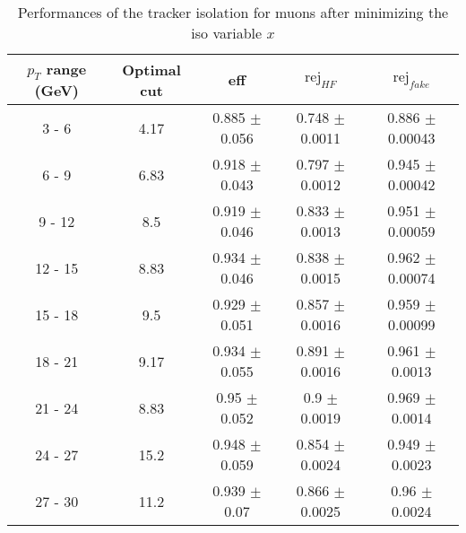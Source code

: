 \begin{table}[htbp]
   \centering
   \begin{tabular}{|c|c|c|c|c|}
      \hline
      $p_T$ range (GeV) & Optimal cut & eff & $\textrm{rej}_{HF}$ & $\textrm{rej}_{fake}$ \\
      \hline
      3 - 6 & 4.17 & 0.885 $\pm$ 0.056 & 0.748 $\pm$ 0.0011 & 0.886 $\pm$ 0.00043 \\
      \hline
      6 - 9 & 6.83 & 0.918 $\pm$ 0.043 & 0.797 $\pm$ 0.0012 & 0.945 $\pm$ 0.00042 \\
      \hline
      9 - 12 & 8.5 & 0.919 $\pm$ 0.046 & 0.833 $\pm$ 0.0013 & 0.951 $\pm$ 0.00059 \\
      \hline
      12 - 15 & 8.83 & 0.934 $\pm$ 0.046 & 0.838 $\pm$ 0.0015 & 0.962 $\pm$ 0.00074 \\
      \hline
      15 - 18 & 9.5 & 0.929 $\pm$ 0.051 & 0.857 $\pm$ 0.0016 & 0.959 $\pm$ 0.00099 \\
      \hline
      18 - 21 & 9.17 & 0.934 $\pm$ 0.055 & 0.891 $\pm$ 0.0016 & 0.961 $\pm$ 0.0013 \\
      \hline
      21 - 24 & 8.83 & 0.95 $\pm$ 0.052 & 0.9 $\pm$ 0.0019 & 0.969 $\pm$ 0.0014 \\
      \hline
      24 - 27 & 15.2 & 0.948 $\pm$ 0.059 & 0.854 $\pm$ 0.0024 & 0.949 $\pm$ 0.0023 \\
      \hline
      27 - 30 & 11.2 & 0.939 $\pm$ 0.07 & 0.866 $\pm$ 0.0025 & 0.96 $\pm$ 0.0024 \\
      \hline
   \end{tabular}
   \caption{\small{Performances of the tracker isolation for muons after minimizing the iso variable $x$}\label{tab:track_muon_opt}}
\end{table}






